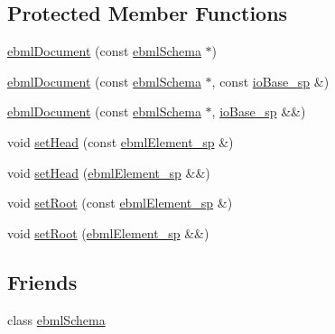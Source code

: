 \subsection*{Protected Member Functions}
\begin{DoxyCompactItemize}
\item 
\mbox{\hyperlink{classebml_1_1ebmlDocument_a7ad723caca4bea0c0991e3e3dd102c7d}{ebml\+Document}} (const \mbox{\hyperlink{classebml_1_1ebmlSchema}{ebml\+Schema}} $\ast$)
\item 
\mbox{\hyperlink{classebml_1_1ebmlDocument_a3bc6d62192147a62deee0684ab9c3939}{ebml\+Document}} (const \mbox{\hyperlink{classebml_1_1ebmlSchema}{ebml\+Schema}} $\ast$, const \mbox{\hyperlink{namespaceebml_a7bb59128ac6af27e47367938a846b569}{io\+Base\+\_\+sp}} \&)
\item 
\mbox{\hyperlink{classebml_1_1ebmlDocument_a2c834b20ecc9613ceb585f735cd3162c}{ebml\+Document}} (const \mbox{\hyperlink{classebml_1_1ebmlSchema}{ebml\+Schema}} $\ast$, \mbox{\hyperlink{namespaceebml_a7bb59128ac6af27e47367938a846b569}{io\+Base\+\_\+sp}} \&\&)
\item 
void \mbox{\hyperlink{classebml_1_1ebmlDocument_ad61feb3fb9966a0b3b9d2f5f5cdd4dd0}{set\+Head}} (const \mbox{\hyperlink{namespaceebml_adad533b7705a16bb360fe56380c5e7be}{ebml\+Element\+\_\+sp}} \&)
\item 
void \mbox{\hyperlink{classebml_1_1ebmlDocument_add439a24bc460b0a3ece976003c865c1}{set\+Head}} (\mbox{\hyperlink{namespaceebml_adad533b7705a16bb360fe56380c5e7be}{ebml\+Element\+\_\+sp}} \&\&)
\item 
void \mbox{\hyperlink{classebml_1_1ebmlDocument_ab845edd17a23f956d0fd9461a26053cd}{set\+Root}} (const \mbox{\hyperlink{namespaceebml_adad533b7705a16bb360fe56380c5e7be}{ebml\+Element\+\_\+sp}} \&)
\item 
void \mbox{\hyperlink{classebml_1_1ebmlDocument_a709554a561abcbb47f51a14c59682c74}{set\+Root}} (\mbox{\hyperlink{namespaceebml_adad533b7705a16bb360fe56380c5e7be}{ebml\+Element\+\_\+sp}} \&\&)
\end{DoxyCompactItemize}
\subsection*{Friends}
\begin{DoxyCompactItemize}
\item 
class \mbox{\hyperlink{classebml_1_1ebmlDocument_ab99d947c503dbe1ab7ebb0a75c24e4df}{ebml\+Schema}}
\end{DoxyCompactItemize}


